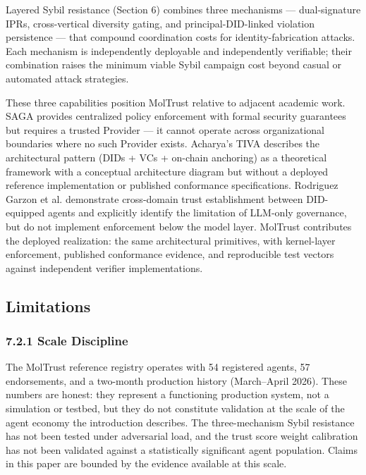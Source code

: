 Layered Sybil resistance (Section 6) combines three mechanisms — dual-signature IPRs, cross-vertical diversity gating, and principal-DID-linked violation persistence — that compound coordination costs for identity-fabrication attacks. Each mechanism is independently deployable and independently verifiable; their combination raises the minimum viable Sybil campaign cost beyond casual or automated attack strategies.


These three capabilities position MolTrust relative to adjacent academic work. SAGA \cite{ref16_syros} provides centralized policy enforcement with formal security guarantees but requires a trusted Provider — it cannot operate across organizational boundaries where no such Provider exists. Acharya's TIVA \cite{ref17_acharya} describes the architectural pattern (DIDs + VCs + on-chain anchoring) as a theoretical framework with a conceptual architecture diagram but without a deployed reference implementation or published conformance specifications. Rodriguez Garzon et al. \cite{ref36_rodriguezgarzon} demonstrate cross-domain trust establishment between DID-equipped agents and explicitly identify the limitation of LLM-only governance, but do not implement enforcement below the model layer. MolTrust contributes the deployed realization: the same architectural primitives, with kernel-layer enforcement, published conformance evidence, and reproducible test vectors against independent verifier implementations.


\subsection{Limitations}

\subsubsection{7.2.1 Scale Discipline}

The MolTrust reference registry operates with 54 registered agents, 57 endorsements, and a two-month production history (March–April 2026). These numbers are honest: they represent a functioning production system, not a simulation or testbed, but they do not constitute validation at the scale of the agent economy the introduction describes. The three-mechanism Sybil resistance has not been tested under adversarial load, and the trust score weight calibration has not been validated against a statistically significant agent population. Claims in this paper are bounded by the evidence available at this scale.


